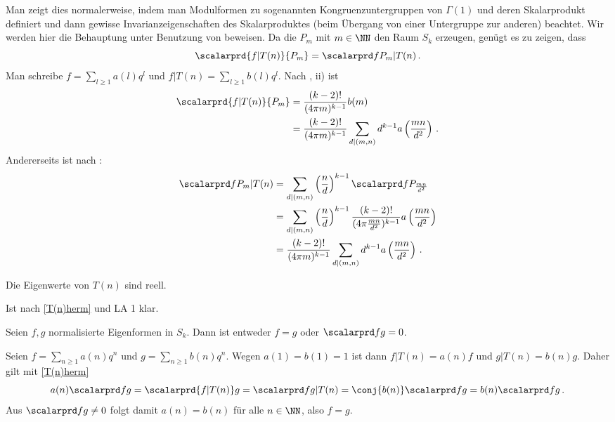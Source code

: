 \begin{bewe}
Man zeigt dies normalerweise, indem man Modulformen zu sogenannten Kongruenzuntergruppen von $\Gamma(1)$ und deren Skalarprodukt definiert und dann gewisse Invarianzeigenschaften des Skalarproduktes (beim Übergang von einer Untergruppe zur anderen) beachtet. Wir werden hier die Behauptung unter Benutzung von  beweisen. Da die $P_m$ mit $m \in \NN$ den Raum $S_k$ erzeugen, genügt es zu zeigen, dass
\[
	\scalarprd {f|T(n)}{P_m} = \scalarprd f{P_m|T(n)}
	\,.
\]
Man schreibe $f = \sum_{l \geq 1} a(l) q^l$ und $f | T(n) = \sum_{l \geq 1} b(l) q^l$. Nach , ii) ist
\begin{align*}
	\scalarprd {f|T(n)}{P_m} &= \frac {(k-2)!}{(4\pi m)^{k-1}} b(m) \\
	&= \frac {(k-2)!}{(4\pi m)^{k-1}} \sum_{d|(m,n)} d^{k-1} a\left( \frac {mn}{d^2} \right)
	\,.
\end{align*}
Andererseits ist nach :
\begin{align*}
	\scalarprd f{P_m|T(n)} &= \sum_{d|(m,n)} \left( \frac nd \right)^{k-1} \scalarprd f{P_{\frac {mn}{d^2}}} \\
	&= \sum_{d|(m,n)} \left( \frac nd \right)^{k-1} \frac {(k-2)!}{(4\pi \frac {mn}{d^2})^{k-1}} a\left( \frac {mn}{d^2} \right) \\
	&= \frac {(k-2)!}{(4\pi m)^{k-1}} \sum_{d|(m,n)} d^{k-1} a\left( \frac {mn}{d^2} \right)
	\,.
\end{align*}
\end{bewe}

\begin{koro}
Die Eigenwerte von $T(n)$ sind reell.
\end{koro}
\begin{bewe}
Ist nach \autoref{T(n)herm} und LA 1 klar.
\end{bewe}

\begin{koro}\label{normEigfkt:id/orth}
Seien $f, g$ normalisierte Eigenformen in $S_k$. Dann ist entweder $f = g$ oder $\scalarprd fg = 0$.
\end{koro}

\begin{bewe}
Seien $f = \sum_{n \geq 1} a(n) q^n$ und $g = \sum_{n \geq 1} b(n) q^n$. Wegen $a(1) = b(1) = 1$ ist dann $f | T(n) = a(n) f$ und $g | T(n) = b(n) g$. Daher gilt mit \autoref{T(n)herm}
\[
	a(n) \scalarprd fg = \scalarprd {f|T(n)}g = \scalarprd f{g|T(n)} = \conj{b(n)} \scalarprd fg = b(n) \scalarprd fg
	\,.
\]
Aus $\scalarprd fg \neq 0$ folgt damit $a(n) = b(n)$ für alle $n \in \NN$, also $f = g$.
\end{bewe}

